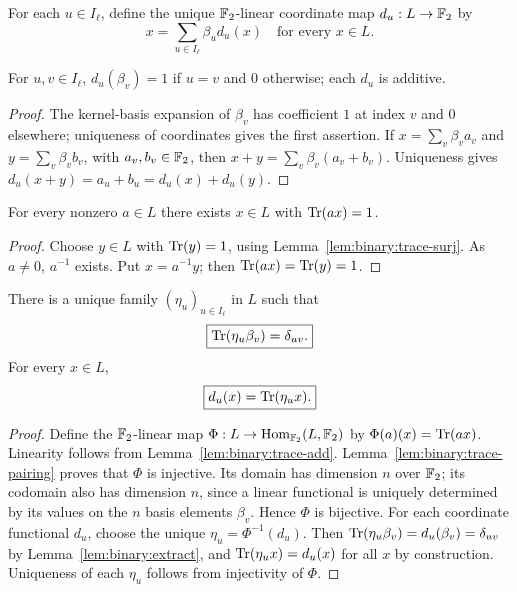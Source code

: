 \begin{definition}\label{def:binary:coords}
For each $u\in I_\ell$, define the unique
$\mathbb{F}_2$-linear coordinate map $d_u:L\to\mathbb{F}_2$ by
\[
 x=\sum_{u\in I_\ell}\beta_u d_u(x)
 \quad\text{for every }x\in L.
\]
\end{definition}

\begin{lemma}\label{lem:binary:extract}
For $u,v\in I_\ell$, $d_u(\beta_v)=1$ if $u=v$ and $0$
otherwise; each $d_u$ is additive.
\end{lemma}
\begin{proof}
The kernel-basis expansion of $\beta_v$ has coefficient $1$
at index $v$ and $0$ elsewhere; uniqueness of coordinates
gives the first assertion. If $x=\sum_v\beta_v a_v$ and
$y=\sum_v\beta_v b_v$, with $a_v,b_v\in\mathbb{F}_2$, then
$x+y=\sum_v\beta_v(a_v+b_v)$. Uniqueness gives
$d_u(x+y)=a_u+b_u=d_u(x)+d_u(y)$.
\end{proof}

\begin{lemma}\label{lem:binary:trace-pairing}
For every nonzero $a\in L$ there exists $x\in L$ with
$\operatorname{Tr}(ax)=1$.
\end{lemma}
\begin{proof}
Choose $y\in L$ with $\operatorname{Tr}(y)=1$, using
Lemma~\ref{lem:binary:trace-surj}. As $a\neq0$,
$a^{-1}$ exists. Put $x=a^{-1}y$; then
$\operatorname{Tr}(ax)=\operatorname{Tr}(y)=1$.
\end{proof}

\begin{theorem}\label{thm:binary:dual-basis}
There is a unique family $(\eta_u)_{u\in I_\ell}$ in $L$ such that
\[
 \boxed{\operatorname{Tr}(\eta_u\beta_v)=\delta_{uv}.}
\]
For every $x\in L$,
\[
 \boxed{d_u(x)=\operatorname{Tr}(\eta_u x).}
\]
\end{theorem}
\begin{proof}
Define the $\mathbb{F}_2$-linear map
$\Phi:L\to\operatorname{Hom}_{\mathbb{F}_2}(L,\mathbb{F}_2)$ by
$\Phi(a)(x)=\operatorname{Tr}(ax)$. Linearity follows from
Lemma~\ref{lem:binary:trace-add}.
Lemma~\ref{lem:binary:trace-pairing} proves that $\Phi$
is injective. Its domain has dimension $n$ over $\mathbb{F}_2$;
its codomain also has dimension $n$, since a linear functional
is uniquely determined by its values on the $n$ basis elements
$\beta_v$. Hence $\Phi$ is bijective.
For each coordinate functional $d_u$, choose the unique
$\eta_u=\Phi^{-1}(d_u)$. Then
$\operatorname{Tr}(\eta_u\beta_v)=d_u(\beta_v)=\delta_{uv}$
by Lemma~\ref{lem:binary:extract}, and
$\operatorname{Tr}(\eta_u x)=d_u(x)$ for all $x$ by construction.
Uniqueness of each $\eta_u$ follows from injectivity
of $\Phi$.
\end{proof}

